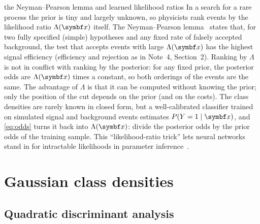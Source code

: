 \documentclass[11pt]{article}
\begin{document}
\begin{physics}{the Neyman--Pearson lemma and learned likelihood ratios}
In a search for a rare process the prior is tiny and largely unknown, so physicists rank events by the likelihood
ratio $\Lambda(\x)$ itself. The Neyman--Pearson lemma~\cite{neyman1933} states that, for two fully specified
(simple) hypotheses and any fixed rate of falsely accepted background, the test that accepts events with large
$\Lambda(\x)$ has the highest signal efficiency (efficiency and rejection as in Note~4, Section~2). Ranking by $\Lambda$ is not in conflict with ranking by the posterior:
for any fixed prior, the posterior odds are $\Lambda(\x)$ times a constant, so both orderings of the events are the
same. The advantage of $\Lambda$ is that it can be computed without knowing the prior; only the position of the cut
depends on the prior (and on the costs). The class densities are
rarely known in closed form, but a well-calibrated classifier trained on simulated signal and background events
estimates $P(Y = 1 \mid \x)$, and \eqref{eq:odds} turns it back into $\Lambda(\x)$: divide the posterior odds by the
prior odds of the training sample. This ``likelihood-ratio trick'' lets neural networks stand in for intractable
likelihoods in parameter inference~\cite{cranmer2015}.
\end{physics}

\section{Gaussian class densities}\label{sec:gaussian}

\subsection{Quadratic discriminant analysis}
\end{document}
